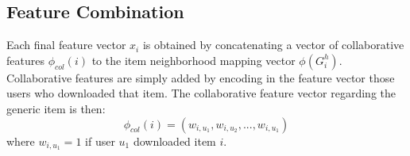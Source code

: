 %
\subsection{Feature Combination}
Each final feature vector $x_i$ is obtained by concatenating a vector of collaborative features $\phi_{col}(i)$ to the item neighborhood mapping vector $\phi(G^h_i)$. Collaborative features are simply added by encoding in the feature vector those users who downloaded that item. The collaborative feature vector regarding the generic item is then:
\[
\phi_{col}(i)=(w_{i,u_1}, w_{i,u_2},...,w_{i,u_1})
\]
where $w_{i,u_1}=1$ if user $u_1$ downloaded item $i$.

